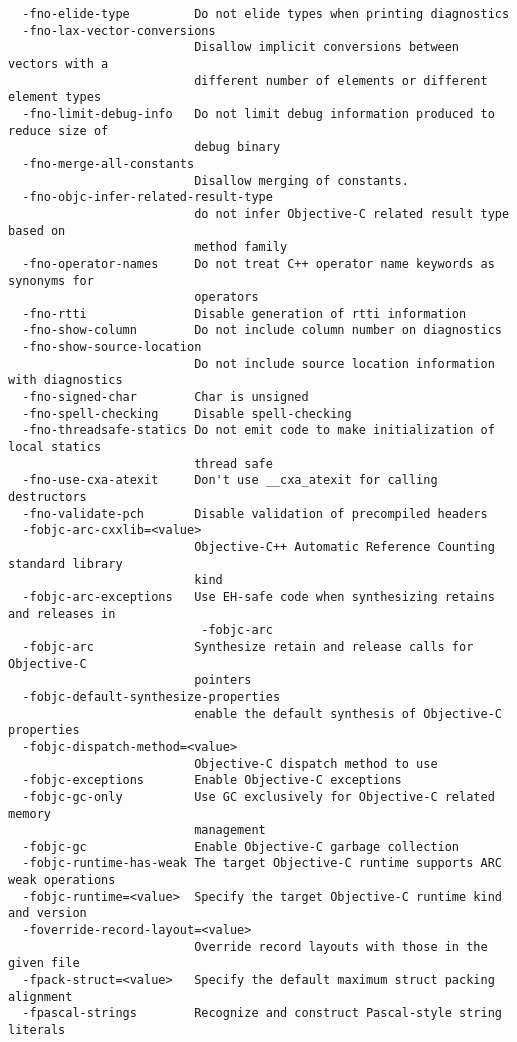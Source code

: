\begin{verbatim}
  -fno-elide-type         Do not elide types when printing diagnostics
  -fno-lax-vector-conversions
                          Disallow implicit conversions between vectors with a 
                          different number of elements or different element types
  -fno-limit-debug-info   Do not limit debug information produced to reduce size of 
                          debug binary
  -fno-merge-all-constants
                          Disallow merging of constants.
  -fno-objc-infer-related-result-type
                          do not infer Objective-C related result type based on 
                          method family
  -fno-operator-names     Do not treat C++ operator name keywords as synonyms for 
                          operators
  -fno-rtti               Disable generation of rtti information
  -fno-show-column        Do not include column number on diagnostics
  -fno-show-source-location
                          Do not include source location information with diagnostics
  -fno-signed-char        Char is unsigned
  -fno-spell-checking     Disable spell-checking
  -fno-threadsafe-statics Do not emit code to make initialization of local statics 
                          thread safe
  -fno-use-cxa-atexit     Don't use __cxa_atexit for calling destructors
  -fno-validate-pch       Disable validation of precompiled headers
  -fobjc-arc-cxxlib=<value>
                          Objective-C++ Automatic Reference Counting standard library
                          kind
  -fobjc-arc-exceptions   Use EH-safe code when synthesizing retains and releases in
                           -fobjc-arc
  -fobjc-arc              Synthesize retain and release calls for Objective-C 
                          pointers
  -fobjc-default-synthesize-properties
                          enable the default synthesis of Objective-C properties
  -fobjc-dispatch-method=<value>
                          Objective-C dispatch method to use
  -fobjc-exceptions       Enable Objective-C exceptions
  -fobjc-gc-only          Use GC exclusively for Objective-C related memory 
                          management
  -fobjc-gc               Enable Objective-C garbage collection
  -fobjc-runtime-has-weak The target Objective-C runtime supports ARC weak operations
  -fobjc-runtime=<value>  Specify the target Objective-C runtime kind and version
  -foverride-record-layout=<value>
                          Override record layouts with those in the given file
  -fpack-struct=<value>   Specify the default maximum struct packing alignment
  -fpascal-strings        Recognize and construct Pascal-style string literals

\end{verbatim}
